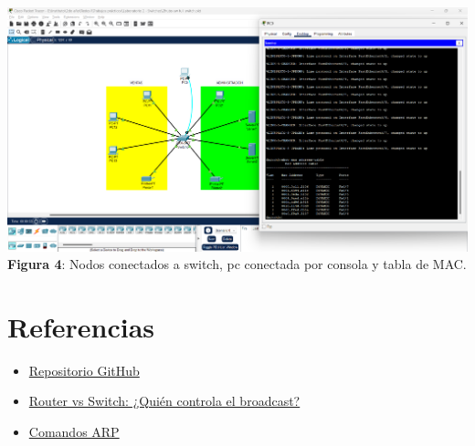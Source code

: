 \documentclass{article}
\begin{document}
    \begin{center}
        \includegraphics[width=0.85\linewidth]{img_05} 
        \linebreak
        \small {\bfseries Figura 4}: Nodos conectados a switch, pc conectada por consola y tabla de MAC.
    \end{center}

    \pagebreak
    \section{Referencias}
        \begin{itemize}
            \item \href{https://github.com/MarianC312/Laboratorio_2_Switches}{Repositorio GitHub}
            \item \href{https://www.youtube.com/watch?v=5KH_b8RI_Lw}{Router vs Switch: ¿Quién controla el broadcast?}
            \item \href{https://francisconi.org/linux/comandos/arp}{Comandos ARP}
        \end{itemize}
\end{document}
